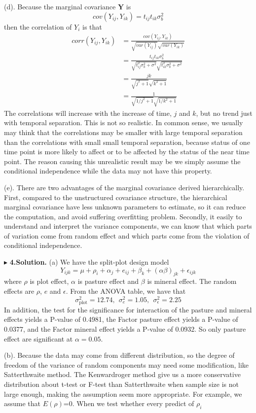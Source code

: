 \documentclass[letterpaper, 12pt]{article}
\newcommand{\ba}{$$\begin{aligned}}
\newcommand{\ea}{\end{aligned}$$}
\begin{document}
(d). Because the marginal covariance $\bm{Y}$ is
$$
cov(Y_{ij},Y_{ik})=t_{ij}t_{ik}\sigma_b^2
$$
then the correlation of $Y_i$ is that 
\ba
corr(Y_{ij},Y_{ik})&=\frac{cov(Y_{ij},Y_{ik})}{\sqrt{var(Y_{ij})}\sqrt{var(Y_{ik})}}\\
&=\frac{t_{ij}t_{ik}\sigma_b^2}{\sqrt{t_{ij}^2\sigma_b^2+\sigma^2}\sqrt{t_{ik}^2\sigma_b^2+\sigma^2}}\\
&=\frac{jk}{\sqrt{j^2+1}\sqrt{k^2+1}}\\
&=\frac{1}{\sqrt{1/j^2+1}\sqrt{1/k^2+1}}
\ea
The correlations will increase with the increase of time, $j$ and $k$, but no trend just with temporal separation. This is not so realistic. In common sense, we usually may think that the correlations may be smaller with large temporal separation than the correlations with small small temporal separation, because status of one time point is more likely to affect or to be affected by the status of the near time point. The reason causing this unrealistic result may be we simply assume the conditional independence while the data may not have this property.

(e). There are two advantages of the marginal covariance derived hierarchically. First, compared to the unstructured covariance structure, the hierarchical marginal covariance have less unknown parameters to estimate, so it can reduce the computation, and avoid suffering overfitting problem. Secondly, it easily to understand and interpret the variance components, we can know that which parts of variation come from random effect and which parts come from the violation of conditional independence.




$\blacktriangleright$ \textbf{4.\quad Solution.} 
(a) We have the split-plot design model
$$
Y_{ijk}=\mu+\rho_i+\alpha_j+e_{ij}+\beta_k+(\alpha\beta)_{jk}+\epsilon_{ijk}
$$
where $\rho$ is plot effect, $\alpha$ is pasture effect and $\beta$ is mineral effect. The random effects are $\rho$, $e$ and $\epsilon$. From the ANOVA table, we have that
$$
\sigma_{\text{plot}}^2=12.74,\ \ \sigma^2_{e}=1.05,\ \ \sigma_\epsilon^2=2.25
$$
In addition, the test for the significance for interaction of the pasture and mineral effects yields a P-value of 0.4981, the Factor pasture effect yields a P-value of 0.0377, and the Factor mineral effect yields a P-value of 0.0932. So only pasture effect are significant at $\alpha=0.05$.

(b). Because the data may come from different distribution, so the degree of freedom of the variance of random components may need some modification, like Satterthwaite method. The Kenwardroger method give us a more conservative distribution about t-test or F-test than Satterthwaite when sample size is not large enough, making the assumption seem more appropriate. For example, we assume that $E(\rho)$=0. When we test whether every predict of $\rho_i$ 
\end{document}
